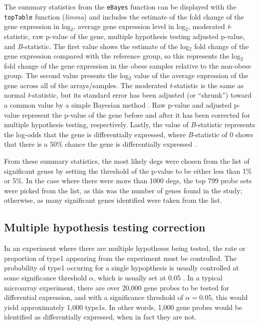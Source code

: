The summary statistics from the \texttt{eBayes} function can be displayed with the \texttt{topTable} function (\textit{limma}) and includes the estimate of the fold change of the gene expression in log$_2$, average gene expression level in log$_2$, moderated \textit{t}-statistic, raw p-value of the gene, multiple hypothesis testing adjusted p-value, and \textit{B}-statistic.
The first value shows the estimate of the log$_2$ fold change of the gene expression compared with the reference group, so this represents the log$_2$ fold change of the gene expression in the obese samples relative to the non-obese group.
The second value presents the log$_2$ value of the average expression of the gene across all of the arrays/samples.
The moderated \textit{t}-statistic is the same as normal \textit{t}-statistic, but its standard error has been adjusted (or ``shrunk'') toward a common value by a simple Bayesian method \citep{Smyth2005}.
Raw p-value and adjusted p-value represent the p-value of the gene before and after it has been corrected for multiple hypothesis testing, respectively.
Lastly, the value of \textit{B}-statistic represents the log-odds that the gene is differentially expressed, where \textit{B}-statistic of 0 shows that there is a 50\% chance the gene is differentially expressed \citep{Smyth2005}.

From these summary statistics, the most likely \glspl{deg} were chosen from the list of significant genes by setting the threshold of the p-value to be either less than 1\% or 5\%.
In the case where there were more than 1000 \glspl{deg}, the top 799 probe sets were picked from the list, as this was the number of genes found in the \citet{Creighton2012} study; otherwise, as many significant genes identified were taken from the list.

\subsection{Multiple hypothesis testing correction}
\label{sub:multiple_hypothesis_testing_correction}

In an experiment where there are multiple hypotheses being tested, the rate or proportion of \gls{type1} appearing from the experiment must be controlled.
The probability of \gls{type1} occuring for a single hypopthesis is usually controlled at some significance threshold $\alpha$, which is usually set at 0.05 \citep{Shaffer1995}.
In a typical microarray experiment, there are over 20,000 gene probes to be tested for differential expression, and with a significance threshold of $\alpha = 0.05$, this would yield approximately 1,000 \glspl{type1}.
In other words, 1,000 gene probes would be identified as differentially expressed, when in fact they are not.

